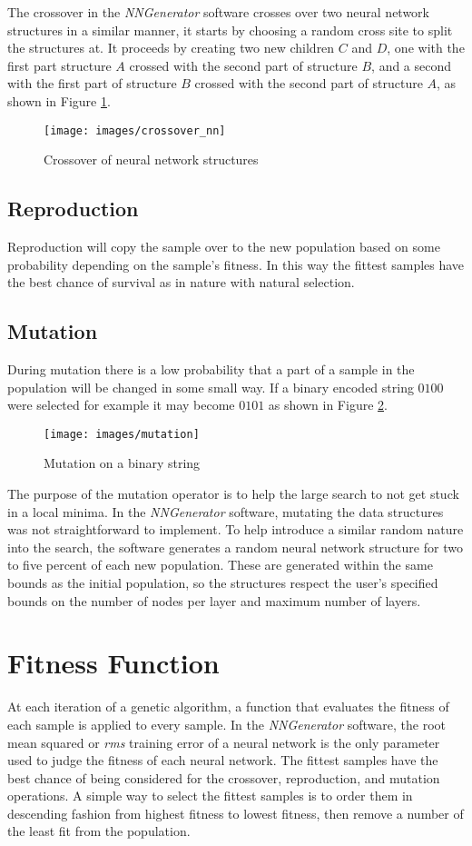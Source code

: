 The crossover in the {\it NNGenerator} software crosses over two
neural network structures in a similar manner, it starts by choosing a
random cross site to split the structures at.
It proceeds by creating two new children $C$ and $D$, one with the first part
structure $A$ crossed with the second part of structure $B$, and a
second with the first part of structure $B$ crossed with the second
part of structure $A$, as shown in Figure \ref{crossover_nn}.

\begin{figure}[h!]
  \centering
  \texttt{[image: images/crossover\_nn]}
  \caption{Crossover of neural network structures}
  \label{crossover_nn}
\end{figure}

\subsection{Reproduction}
Reproduction will copy the sample over to the new population based on some probability depending on the sample's fitness. 
In this way the fittest samples have the best chance of survival as in nature with natural selection.

\subsection{Mutation}
During mutation there is a low probability that a part of a sample in the population will be changed in some small way. 
If a binary encoded string $0100$ were selected for example it may become $0101$ as shown in Figure \ref{mutation}.

\begin{figure}[h!]
  \centering
  \texttt{[image: images/mutation]}
  \caption{Mutation on a binary string}
  \label{mutation}
\end{figure}

The purpose of the mutation operator is to help the large search to not get stuck
in a local minima.
In the {\it NNGenerator} software, mutating the data structures was not
straightforward to implement. 
To help introduce a similar random nature into the search, the software generates a random neural network structure for two to five percent of each new
population.
These are generated within the same bounds as the initial population,
so the structures respect the user's specified bounds on the number of
nodes per layer and maximum number of layers.

\section{Fitness Function}
At each iteration of a genetic algorithm, a function that evaluates the fitness of each sample is applied to every sample.
In the {\it NNGenerator} software, the root mean squared or {\it rms}
training error of a neural network is the only parameter used to
judge the fitness of each neural network.
The fittest samples have the best chance of being considered for the crossover, reproduction, and mutation operations.
A simple way to select the fittest samples is to order them in descending fashion from highest fitness to lowest fitness, then remove a number of the least fit from the population.

